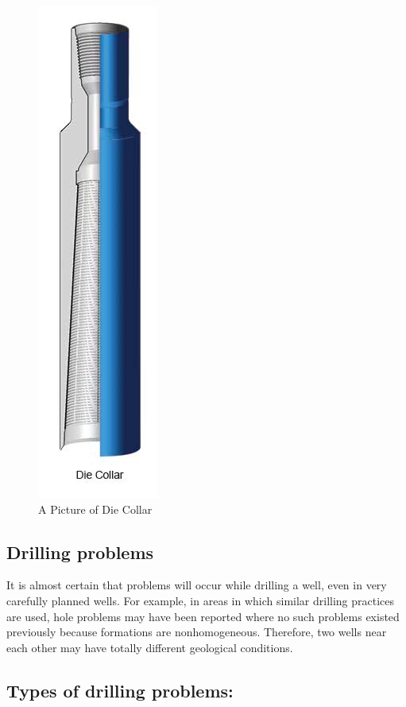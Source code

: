 \begin{itemize}
\begin{figure}[H]
\includegraphics[scale=0.15]{images/Diecollar}
\centering 
\caption{A Picture of Die Collar}
\end{figure}

\subsection*{Drilling problems}

It is almost certain that problems will occur while drilling a well, even in very carefully planned wells. 
For example, in areas in which similar drilling practices are used, hole problems may have been reported
where no such problems existed previously because formations are nonhomogeneous. Therefore, two wells near
each other may have totally different geological conditions. 

\vspace{1em}

\subsection*{Types of drilling problems:}


\end{itemize}
